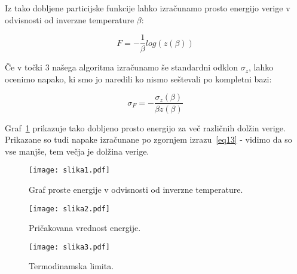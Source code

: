 \documentclass[a4paper]{article}
\begin{document}
    Iz tako dobljene particijske funkcije lahko izračunamo prosto energijo verige v odvisnosti od inverzne temperature
    $\beta$:

    \begin{equation}\label{eq12}
        F = -\frac{1}{\beta}log(z(\beta))
    \end{equation}

    Če v točki $3$ našega algoritma izračunamo še standardni odklon $\sigma_z$, lahko ocenimo napako, ki smo jo naredili
    ko nismo seštevali po kompletni bazi:

    \begin{equation}\label{eq13}
    \sigma_F = -\frac{\sigma_z(\beta)}{\beta z(\beta)}
    \end{equation}

    Graf~\ref{slika1} prikazuje tako dobljeno prosto energijo za več različnih dolžin verige.
    Prikazane so tudi napake izračunane po zgornjem izrazu~\ref{eq13} - vidimo da so vse manjše, tem večja je dolžina
    verige.

    \begin{figure}
        \centering
        \texttt{[image: slika1.pdf]}
        \caption{Graf proste energije v odvisnosti od inverzne temperature.}
        \label{slika1}
    \end{figure}

    \begin{figure}
        \centering
        \texttt{[image: slika2.pdf]}
        \caption{Pričakovana vrednost energije.}
        \label{slika2}
    \end{figure}

    \begin{figure}
        \centering
        \texttt{[image: slika3.pdf]}
        \caption{Termodinamska limita.}
        \label{slika3}
    \end{figure}
\end{document}
